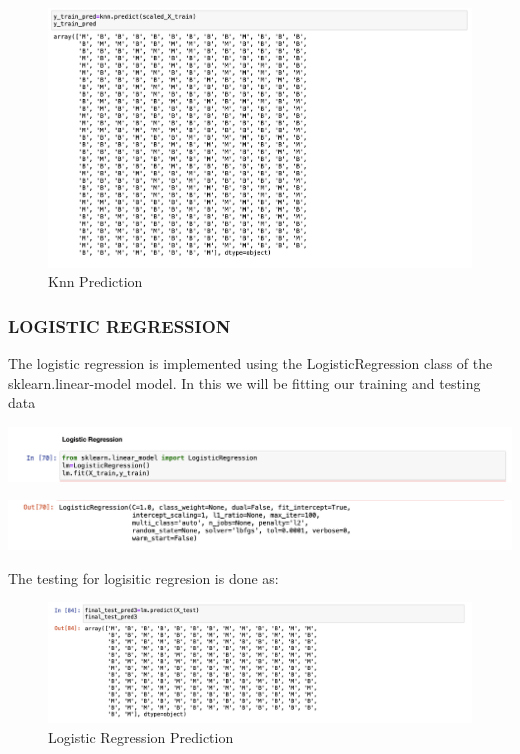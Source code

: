 \documentclass[12pt]{article}
\begin{document}
\begin{center}
\begin{figure}[h]
\centerline{\includegraphics[scale=.4]{knnpred.png}}
\caption{Knn Prediction}
\end{figure}
\end{center}

\newpage
\subsubsection{\textbf{LOGISTIC REGRESSION }}
The logistic regression is implemented using the LogisticRegression class of the sklearn.linear-model model. In this we will be fitting our training and testing data

\begin{center}
\centerline{\includegraphics[scale=.4]{lr.png}}
\end{center}

\begin{center}
\centerline{\includegraphics[scale=.4]{lr2.png}}
\end{center}

The testing for logisitic regresion is done as: 

\begin{center}
\begin{figure}[h]
\centerline{\includegraphics[scale=.4]{lrtest.png}}
\caption{Logistic Regression Prediction}
\end{figure}
\end{center}
\newpage 
\end{document}
